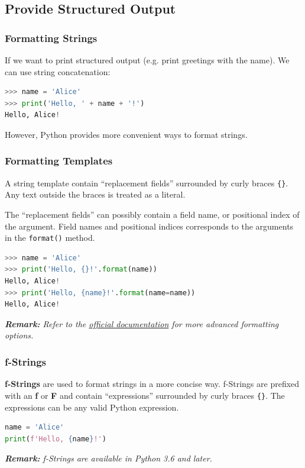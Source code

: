 \documentclass[beamer, en, version=2.0]{huangfusl-template}
\begin{document}
    \subsection{Provide Structured Output}
    \begin{frame}[fragile]
        \frametitle{Formatting Strings}

        If we want to print structured output (e.g. print greetings with the name). We can use string concatenation:

\begin{lstlisting}[language=python]
>>> name = 'Alice'
>>> print('Hello, ' + name + '!')
Hello, Alice!
\end{lstlisting}

    However, Python provides more convenient ways to format strings.

    \end{frame}
    \begin{frame}[fragile]
        \frametitle{Formatting Templates}

        A string template contain ``replacement fields'' surrounded by curly braces {\footnotesize\verb|{}|}. Any text outside the braces is treated as a literal.

        The ``replacement fields'' can possibly contain a field name, or positional index of the argument. Field names and positional indices corresponds to the arguments in the {\footnotesize\verb|format()|} method.

\begin{lstlisting}[language=python]
>>> name = 'Alice'
>>> print('Hello, {}!'.format(name))
Hello, Alice!
>>> print('Hello, {name}!'.format(name=name))
Hello, Alice!
\end{lstlisting}

        {\footnotesize\itshape\textbf{Remark:} Refer to the \href{https://docs.python.org/3/library/string.html#format-specification-mini-language}{\color{darkblue} official documentation} for more advanced formatting options.}
    \end{frame}
    \begin{frame}[fragile]
        \frametitle{f-Strings}

        \textbf{f-Strings} are used to format strings in a more concise way. f-Strings are prefixed with an \textbf{f} or \textbf{F} and contain ``expressions'' surrounded by curly braces {\footnotesize\verb|{}|}. The expressions can be any valid Python expression.

\begin{lstlisting}[language=python]
name = 'Alice'
print(f'Hello, {name}!')
\end{lstlisting}

        {\footnotesize\itshape\textbf{Remark:} f-Strings are available in Python 3.6 and later.}
    \end{frame}
\end{document}
